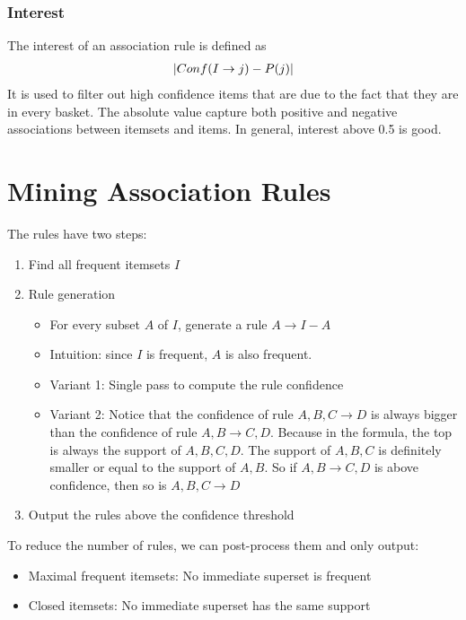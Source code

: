 \subsubsection{Interest}
The interest of an association rule is defined as 
    \begin{align*}
        \left| Conf(I\rightarrow j) - P(j) \right|
    \end{align*}
It is used to filter out high confidence items that are due to the fact that they are in every basket. The absolute value capture both positive and negative associations between itemsets and items. In general, interest above 0.5 is good. 


\section{Mining Association Rules}

The rules have two steps: 
    \begin{enumerate}
        \item Find all frequent itemsets $I$
        \item Rule generation
            \begin{itemize}
                \item For every subset $A$ of $I$, generate a rule $A \rightarrow I - A$
                \item Intuition: since $I$ is frequent, $A$ is also frequent. 
                \item Variant 1: Single pass to compute the rule confidence 
                \item Variant 2: Notice that the confidence of rule $A, B, C \rightarrow D$ is always bigger than the confidence of rule $A, B \rightarrow C, D$. Because in the formula, the top is always the support of $A, B, C,D$. The support of $A, B, C$ is definitely smaller or equal to the support of $A, B$. So if $A, B \rightarrow C, D$ is above confidence, then so is $A, B, C \rightarrow D$
            \end{itemize} 
        \item Output the rules above the confidence threshold
    \end{enumerate}
To reduce the number of rules, we can post-process them and only output: 
    \begin{itemize}
        \item Maximal frequent itemsets: No immediate superset is frequent 
        \item Closed itemsets: No immediate superset has the same support
    \end{itemize}
    

